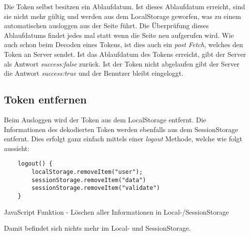 Die Token selbst besitzen ein Ablaufdatum. Ist dieses Ablaufdatum erreicht, sind sie nicht mehr 
gültig und werden aus dem LocalStorage geworfen, was zu einem automatischen ausloggen aus der Seite führt. Die Überprüfung dieses Ablaufdatums 
findet jedes mal statt wenn die Seite neu aufgerufen wird. Wie auch schon beim Decoden eines Tokens,
ist dies auch ein \textit{post Fetch}, welches den Token an Server sendet. Ist das Ablaufdatum des
Tokens erreicht, gibt der Server als Antwort \textit{success:false} zurück. 
Ist der Token nicht abgelaufen gibt der Server die Antwort \textit{success:true} und 
der Benutzer bleibt eingeloggt. 

\subsection{Token entfernen}

Beim Ausloggen wird der Token aus dem LocalStorage entfernt. Die Informationen des dekodierten Token 
werden ebenfalls aus dem SessionStorage entfernt. Dies erfolgt ganz einfach mittels einer \textit{logout}
Methode, welche wie folgt aussieht:

\begin{code}[htp]
\begin{lstlisting}
    logout() {
        localStorage.removeItem("user");
        sessionStorage.removeItem("data")
        sessionStorage.removeItem("validate")
    }    
\end{lstlisting}
\caption{JavaScript Funktion - Löschen aller Informationen in Local-/SessionStorage}
\end{code}
Damit befindet sich nichts mehr im Local- und SessionStorage.
